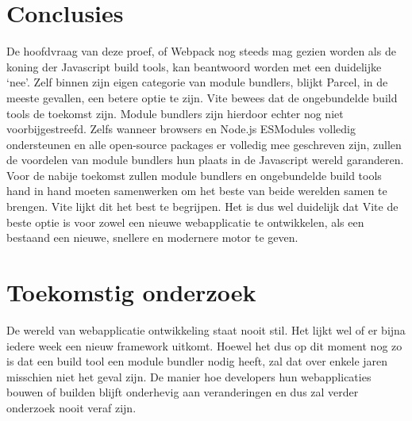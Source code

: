 \begin{multicols}{2}
\section*{Conclusies}
\color{black}
De hoofdvraag van deze proef, of Webpack nog steeds mag gezien worden als de koning der Javascript build tools, kan beantwoord worden met een duidelijke ‘nee’. Zelf binnen zijn eigen categorie van module bundlers, blijkt Parcel, in de meeste gevallen, een betere optie te zijn. Vite bewees dat de ongebundelde build tools de toekomst zijn. Module bundlers zijn hierdoor echter nog niet voorbijgestreefd. Zelfs wanneer browsers en Node.js ESModules volledig ondersteunen en alle open-source packages er volledig mee geschreven zijn, zullen de voordelen van module bundlers hun plaats in de Javascript wereld garanderen. Voor de nabije toekomst zullen module bundlers en ongebundelde build tools hand in hand moeten samenwerken om het beste van beide werelden samen te brengen. Vite lijkt dit het best te begrijpen. Het is dus wel duidelijk dat Vite de beste optie is voor zowel een nieuwe webapplicatie te ontwikkelen, als een bestaand een nieuwe, snellere en modernere motor te geven.
\color{HoGentAccent1} 
\section*{Toekomstig onderzoek}
\color{black}

De wereld van webapplicatie ontwikkeling staat nooit stil. Het lijkt wel of er bijna iedere week een nieuw framework uitkomt. Hoewel het dus op dit moment nog zo is dat een build tool een module bundler nodig heeft, zal dat over enkele jaren misschien niet het geval zijn. De manier hoe developers hun webapplicaties bouwen of builden blijft onderhevig aan veranderingen en dus zal verder onderzoek nooit veraf zijn.


\end{multicols}
